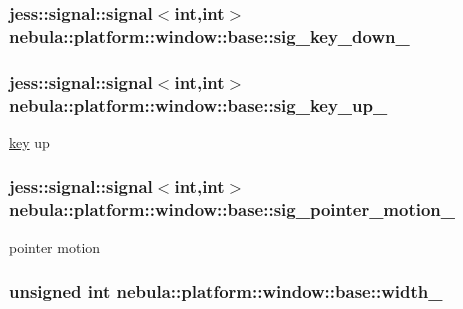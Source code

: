 \label{classnebula_1_1platform_1_1window_1_1base_aadadee1e2f89111165948007fd40986b}
\hypertarget{classnebula_1_1platform_1_1window_1_1base_a7cc037a22541ebb0073ccb5a291d4bae}{
\subsubsection[{sig\_\-key\_\-down\_\-}]{\setlength{\rightskip}{0pt plus 5cm}jess::signal::signal$<$int,int$>$ {\bf nebula::platform::window::base::sig\_\-key\_\-down\_\-}}}
\label{classnebula_1_1platform_1_1window_1_1base_a7cc037a22541ebb0073ccb5a291d4bae}
\hypertarget{classnebula_1_1platform_1_1window_1_1base_a7dc6d6abd5bd88a775e85fc48a1f69e7}{
\subsubsection[{sig\_\-key\_\-up\_\-}]{\setlength{\rightskip}{0pt plus 5cm}jess::signal::signal$<$int,int$>$ {\bf nebula::platform::window::base::sig\_\-key\_\-up\_\-}}}
\label{classnebula_1_1platform_1_1window_1_1base_a7dc6d6abd5bd88a775e85fc48a1f69e7}


\hyperlink{classnebula_1_1platform_1_1key}{key} up \hypertarget{classnebula_1_1platform_1_1window_1_1base_a85ea0376b7d86fd764e308f51d5a758f}{
\subsubsection[{sig\_\-pointer\_\-motion\_\-}]{\setlength{\rightskip}{0pt plus 5cm}jess::signal::signal$<$int,int$>$ {\bf nebula::platform::window::base::sig\_\-pointer\_\-motion\_\-}}}
\label{classnebula_1_1platform_1_1window_1_1base_a85ea0376b7d86fd764e308f51d5a758f}


pointer motion \hypertarget{classnebula_1_1platform_1_1window_1_1base_a6769bf7bc045cf361fc30cefb2fc9697}{
\subsubsection[{width\_\-}]{\setlength{\rightskip}{0pt plus 5cm}unsigned int {\bf nebula::platform::window::base::width\_\-}}}
\label{classnebula_1_1platform_1_1window_1_1base_a6769bf7bc045cf361fc30cefb2fc9697}



